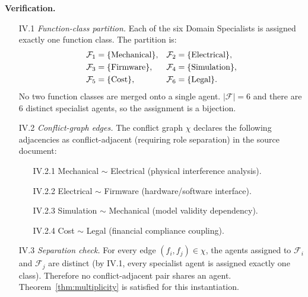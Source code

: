 \documentclass[12pt]{article}
\theoremstyle{definition}
\begin{document}
\medskip
\noindent\textbf{Verification.}
\begin{enumerate}
    \item[IV.1] \emph{Function-class partition.}  Each of the six
                Domain Specialists is assigned exactly one function
                class.  The partition is:
                \begin{align}
                    \mathcal{F}_{1} &= \{\text{Mechanical}\},
                    &
                    \mathcal{F}_{2} &= \{\text{Electrical}\},
                    \notag\\
                    \mathcal{F}_{3} &= \{\text{Firmware}\},
                    &
                    \mathcal{F}_{4} &= \{\text{Simulation}\},
                    \notag\\
                    \mathcal{F}_{5} &= \{\text{Cost}\},
                    &
                    \mathcal{F}_{6} &= \{\text{Legal}\}.
                    \notag
                \end{align}
                No two function classes are merged onto a single agent.
                $|\mathcal{F}| = 6$ and there are $6$ distinct
                specialist agents, so the assignment is a bijection.
                \checkmark

    \item[IV.2] \emph{Conflict-graph edges.}  The conflict graph
                $\chi$ declares the following adjacencies as
                conflict-adjacent (requiring role separation) in the
                source document:
                \begin{enumerate}
                    \item[IV.2.1] Mechanical $\sim$ Electrical
                                  (physical interference analysis).
                    \item[IV.2.2] Electrical $\sim$ Firmware
                                  (hardware/software interface).
                    \item[IV.2.3] Simulation $\sim$ Mechanical
                                  (model validity dependency).
                    \item[IV.2.4] Cost $\sim$ Legal
                                  (financial compliance coupling).
                \end{enumerate}

    \item[IV.3] \emph{Separation check.}  For every edge
                $(f_i, f_j) \in \chi$, the agents assigned to
                $\mathcal{F}_i$ and $\mathcal{F}_j$ are distinct
                (by IV.1, every specialist agent is assigned exactly
                one class).  Therefore no conflict-adjacent pair
                shares an agent.  Theorem~\ref{thm:multiplicity}
                is satisfied for this instantiation. \checkmark


\end{enumerate}
\end{document}
